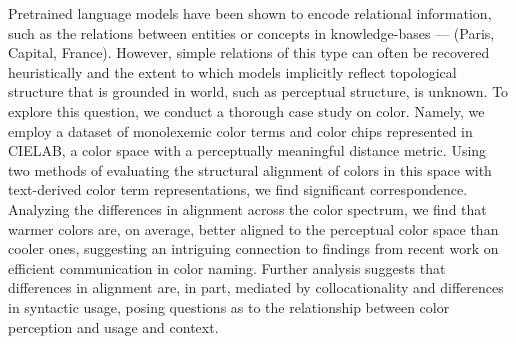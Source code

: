 Pretrained language models have been shown to encode relational information, such as the relations between entities or concepts in knowledge-bases --- (Paris, Capital, France). However, simple relations of this type can often be recovered heuristically and the extent to which models implicitly reflect topological structure that is grounded in world, such as perceptual structure, is unknown. To explore this question, we conduct a thorough case study on color. Namely, we employ a dataset of monolexemic color terms and color chips represented in CIELAB, a color space with a perceptually meaningful distance metric. Using two methods of evaluating the structural alignment of colors in this space with text-derived color term representations, we find significant correspondence. Analyzing the differences in alignment across the color spectrum, we find that warmer colors are, on average, better aligned to the perceptual color space than cooler ones, suggesting an intriguing connection to findings from recent work on efficient communication in color naming. Further analysis suggests that differences in alignment are, in part, mediated by collocationality and differences in syntactic usage, posing questions as to the relationship between color perception and usage and context.
